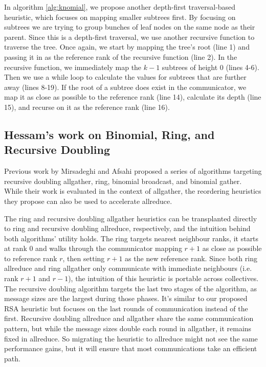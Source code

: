 In algorithm \ref{alg:knomial}, we propose another depth-first traversal-based heuristic, which focuses on mapping smaller subtrees first.
By focusing on subtrees we are trying to group bunches of leaf nodes on the same node as their parent.
Since this is a depth-first traversal, we use another recursive function to traverse the tree. 
Once again, we start by mapping the tree's root (line 1) and passing it in as the reference rank of the recursive function (line 2).
In the recursive function, we immediately map the $k-1$ subtrees of height 0 (lines 4-6).
Then we use a while loop to calculate the values for subtrees that are further away (lines 8-19).
If the root of a subtree does exist in the communicator, we map it as close as possible to the reference rank (line 14), calculate its depth (line 15), and recurse on it as the reference rank (line 16).




\subsection{Hessam's work on Binomial, Ring, and Recursive Doubling}

Previous work by Mirsadeghi and Afsahi \cite{Mirsadeghi2016TopoAwareCollRR} proposed a series of algorithms targeting recursive doubling allgather, ring, binomial broadcast, and binomial gather. 
While their work is evaluated in the context of allgather, the reordering heuristics they propose can also be used to accelerate allreduce. 

The ring and recursive doubling allgather heuristics can be transplanted directly to ring and recursive doubling allreduce, respectively, and the intuition behind both algorithms' utility holds. 
The ring targets nearest neighbour ranks, it starts at rank 0 and walks through the communicator mapping $r+1$ as close as possible to reference rank $r$, then setting $r+1$ as the new reference rank.
Since both ring allreduce and ring allgather only communicate with immediate neighbours (i.e. rank $r+1$ and $r-1$), the intuition of this heuristic is portable across collectives.
The recursive doubling algorithm targets the last two stages of the algorithm, as message sizes are the largest during those phases. 
It's similar to our proposed RSA heuristic but focuses on the last rounds of communication instead of the first. 
Recursive doubling allreduce and allgather share the same communication pattern, but while the message sizes double each round in allgather,  it remains fixed in allreduce.
So migrating the heuristic to allreduce might not see the same performance gains, but it will ensure that most communications take an efficient path.

